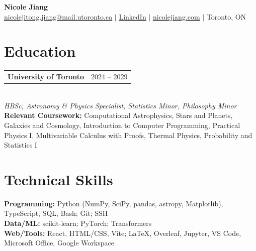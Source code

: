 \documentclass[letterpaper,10pt]{article}
\makeatletter
\newcommand{\heading}[2]{\begin{tabular*}{\textwidth}{l@{\extracolsep{\fill}}r}\textbf{#1} & #2\end{tabular*}}
\makeatother
\begin{document}
\begin{center}
{\Huge\bfseries Nicole Jiang}\\[8pt]
\small \href{mailto:nicolejitong.jiang@mail.utoronto.ca}{\underline{nicolejitong.jiang@mail.utoronto.ca}} $|$ \href{https://www.linkedin.com/in/nicolejitong-jiang/}{\underline{LinkedIn}} $|$ \href{https://nicolejiang.com}{\underline{nicolejiang.com}} $|$ Toronto, ON
\end{center}
\vspace{-9pt}

\section{Education}
\heading{University of Toronto}{2024 -- 2029}\\[-1pt]
{\small\textit{HBSc, Astronomy \& Physics Specialist, Statistics Minor, Philosophy Minor}}\\[2pt]
{\small\textbf{Relevant Coursework:} Computational Astrophysics, Stars and Planets, Galaxies and Cosmology, Introduction to Computer Programming, Practical Physics I, Multivariable Calculus with Proofs, Thermal Physics, Probability and Statistics I}\\[1pt]
\section{Technical Skills}
{\small\textbf{Programming:} Python (NumPy, SciPy, pandas, astropy, Matplotlib), TypeScript, SQL, Bash; Git; SSH}\\[1pt]
{\small\textbf{Data/ML:} scikit-learn; PyTorch; Transformers}\\[1pt]
{\small\textbf{Web/Tools:} React, HTML/CSS, Vite; LaTeX, Overleaf, Jupyter, VS Code, Microsoft Office, Google Workspace}\\[1pt]
\end{document}
